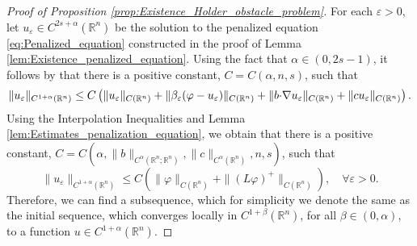 \documentclass[11pt,reqno]{amsart}
\theoremstyle{definition}
\theoremstyle{remark}
\begin{document}
\begin{proof}[Proof of Proposition \ref{prop:Existence_Holder_obstacle_problem}]
For each ${\varepsilon}>0$, let $u_{\varepsilon}\in C^{2s+\alpha}({\mathbb{R}}^n)$ be the solution to the penalized equation \eqref{eq:Penalized_equation} constructed in the proof of Lemma \ref{lem:Existence_penalized_equation}. Using the fact that $\alpha\in(0,2s-1)$, it follows by \cite[Proposition 2.9]{Silvestre_2007} that there is a positive constant, $C=C(\alpha,n,s)$, such that
$$
\|u_{\varepsilon}\|_{C^{1+\alpha}({\mathbb{R}}^n)} \leq C\left(\|u_{\varepsilon}\|_{C({\mathbb{R}}^n)}+\|\beta_{\varepsilon}(\varphi-u_{\varepsilon})\|_{C({\mathbb{R}}^n)}+\|b{\hbox{$\cdot$}}\nabla u_{\varepsilon}\|_{C({\mathbb{R}}^n)} + \|cu_{\varepsilon}\|_{C({\mathbb{R}}^n)}\right).
$$
Using the Interpolation Inequalities \cite[Theorems 8.8.1]{Krylov_LecturesHolder} and Lemma \ref{lem:Estimates_penalization_equation}, we obtain that there is a positive constant, $C=C(\alpha, \|b\|_{C^{\alpha}({\mathbb{R}}^n;{\mathbb{R}}^n)}, \|c\|_{C^{\alpha}({\mathbb{R}}^n)}, n, s)$, such that
\begin{equation}
\label{eq:u_eps_Holder_estimate}
\|u_{\varepsilon}\|_{C^{1+\alpha}({\mathbb{R}}^n)} \leq C\left(\|\varphi\|_{C({\mathbb{R}}^n)}+\|(L\varphi)^+\|_{C({\mathbb{R}}^n)}\right),\quad\forall{\varepsilon}>0.
\end{equation}
Therefore, we can find a subsequence, which for simplicity we denote the same as the initial sequence, which converges locally in $C^{1+\beta}({\mathbb{R}}^n)$, for all $\beta\in(0,\alpha)$, to a function $u \in C^{1+\alpha}({\mathbb{R}}^n)$. 


\end{proof}
\end{document}
